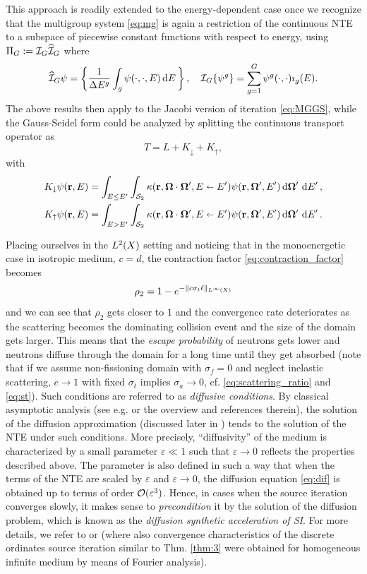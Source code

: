 \begin{remark}\label{rem:MG}
	This approach is readily extended to the energy-dependent case once we recognize that the multigroup system
	\eqref{eq:mg} is again a restriction of the continuous NTE to a subspace of piecewise constant functions with respect
	to energy, using $\Projop[G] := \PiG\PihG$ where
	$$
		\PihG\psi = \left\{\frac{1}{\Delta E^{g}}\int_{g}\psi(\cdot,\cdot,E)\,\d{E}\right\},\quad
		\PiG\{\psi^g\} = \sum_{g=1}^G \psi^g(\cdot,\cdot)\imath_g(E).
	$$
	The above results then apply to the Jacobi version of iteration \eqref{eq:MGGS}, while the Gauss-Seidel form
	could be analyzed by splitting the continuous transport operator as 
	$$
		T = L + K_\downarrow + K_\uparrow,
	$$
	with
	$$
	\begin{aligned}
		K_\downarrow\psi(\br,E) &= \intE[']{E \leq E'}{}{
		\intA[']{\kappa(\br,\bomega\cdot\bomega',E\sla E')\psi(\br,\bomega',E')}},\\
		K_\uparrow\psi(\br,E) &= \intE[']{E > E'}{}{
		\intA[']{\kappa(\br,\bomega\cdot\bomega',E\sla E')\psi(\br,\bomega',E')}}.
	\end{aligned}
	$$
\end{remark}

Placing ourselves in the $\Lp[2](X)$ setting and noticing that in the
monoenergetic case in isotropic medium, $c = d$, the contraction factor \eqref{eq:contraction_factor} becomes
$$
	\rho_2 = 1 - e^{-\norm[{\Lp[\infty](X)}]{c\sigma_t\ell}}
$$
and we can see that $\rho_2$ gets closer to $1$ and the convergence rate deteriorates as the scattering becomes the
dominating collision event and the size of the domain gets larger. This means that the \textit{escape probability} of neutrons gets lower and neutrons diffuse
through the domain for a long time until they get absorbed (note that if we assume non-fissioning domain with $\sigma_f
= 0$ and neglect inelastic scattering, $c \to 1$ with fixed $\sigma_t$ implies $\sigma_a \to 0$, cf.
\eqref{eq:scattering_ratio} and \eqref{eq:st}). Such conditions
are referred to as \textit{diffusive conditions}. By classical asymptotic analysis (see e.g.
\cite{Larsen1} or the overview \cite{AdamsIdea} and references therein), the solution of the diffusion approximation (discussed
later in ) tends to the solution of the NTE under such conditions. More precisely, 
``diffusivity'' of the medium is characterized by a small parameter $\varepsilon \ll 1$ such that $\varepsilon\to 0$ 
reflects the properties described above. The parameter is also defined in such a way that when the terms of the NTE are 
scaled by $\varepsilon$ and $\varepsilon \to 0$, the diffusion equation \eqref{eq:dif} is obtained up to terms of
order $\Oh(\varepsilon^3)$. Hence, in cases when the source iteration converges slowly, it makes sense to 
\textit{precondition} it by the solution of the diffusion problem, which is known as the \textit{diffusion synthetic
acceleration of SI}. For more details, we refer to \cite[Chap. 1]{Azmy1} or \cite[Sec. III]{Adams} (where also
convergence characteristics of the discrete ordinates source iteration similar to Thm. \ref{thm:3} were obtained for
homogeneous infinite medium by means of Fourier analysis).


